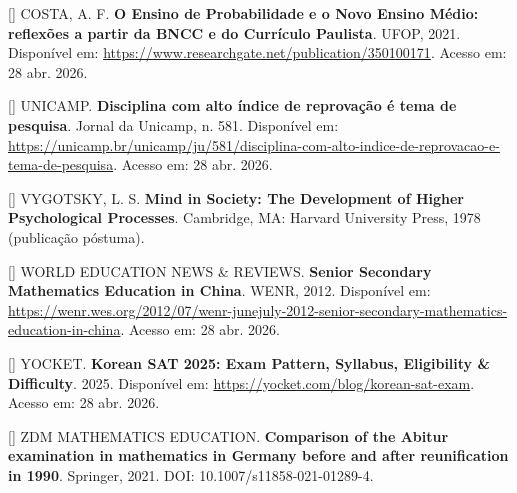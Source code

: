\documentclass[12pt,a4paper,oneside]{article}
\begin{document}
\begin{singlespace}
\noindent\hangindent=1.25cm
[\theequation\label{ref:ufop-prob-bncc}]
COSTA, A. F. \textbf{O Ensino de Probabilidade e o Novo Ensino
Médio: reflexões a partir da BNCC e do Currículo Paulista}. UFOP,
2021. Disponível em:
\url{https://www.researchgate.net/publication/350100171}. Acesso
em: 28 abr. 2026.\par\smallskip

\noindent\hangindent=1.25cm
[\theequation\label{ref:unicamp-calculo}]
UNICAMP. \textbf{Disciplina com alto índice de reprovação é tema
de pesquisa}. Jornal da Unicamp, n. 581. Disponível em:
\url{https://unicamp.br/unicamp/ju/581/disciplina-com-alto-indice-de-reprovacao-e-tema-de-pesquisa}.
Acesso em: 28 abr. 2026.\par\smallskip

\noindent\hangindent=1.25cm
[\theequation\label{ref:vygotsky-1978}]
VYGOTSKY, L. S. \textbf{Mind in Society: The Development of Higher
Psychological Processes}. Cambridge, MA: Harvard University Press,
1978 (publicação póstuma).\par\smallskip

\noindent\hangindent=1.25cm
[\theequation\label{ref:wenr-china}]
WORLD EDUCATION NEWS \& REVIEWS. \textbf{Senior Secondary
Mathematics Education in China}. WENR, 2012. Disponível em:
\url{https://wenr.wes.org/2012/07/wenr-junejuly-2012-senior-secondary-mathematics-education-in-china}.
Acesso em: 28 abr. 2026.\par\smallskip

\noindent\hangindent=1.25cm
[\theequation\label{ref:yocket-korean}]
YOCKET. \textbf{Korean SAT 2025: Exam Pattern, Syllabus,
Eligibility \& Difficulty}. 2025. Disponível em:
\url{https://yocket.com/blog/korean-sat-exam}. Acesso em: 28 abr.
2026.\par\smallskip

\noindent\hangindent=1.25cm
[\theequation\label{ref:zdm-abitur}]
ZDM \textemdash{} MATHEMATICS EDUCATION. \textbf{Comparison of the
Abitur examination in mathematics in Germany before and after
reunification in 1990}. Springer, 2021. DOI:
10.1007/s11858-021-01289-4.\par\smallskip

\end{singlespace}
\end{document}
